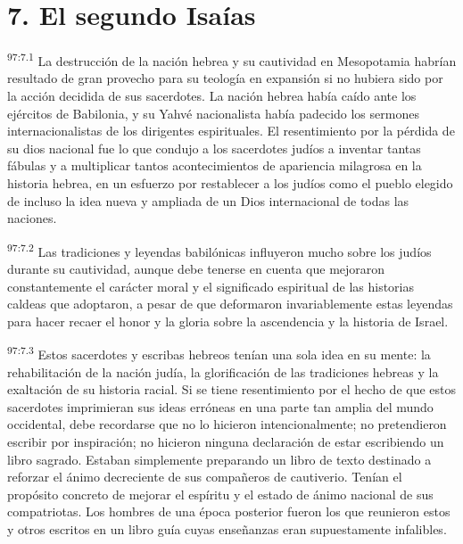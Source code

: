 \section*{7. El segundo Isaías}
\par
\textsuperscript{97:7.1} La destrucción de la nación hebrea y su cautividad en Mesopotamia habrían resultado de gran provecho para su teología en expansión si no hubiera sido por la acción decidida de sus sacerdotes. La nación hebrea había caído ante los ejércitos de Babilonia, y su Yahvé nacionalista había padecido los sermones internacionalistas de los dirigentes espirituales. El resentimiento por la pérdida de su dios nacional fue lo que condujo a los sacerdotes judíos a inventar tantas fábulas y a multiplicar tantos acontecimientos de apariencia milagrosa en la historia hebrea, en un esfuerzo por restablecer a los judíos como el pueblo elegido de incluso la idea nueva y ampliada de un Dios internacional de todas las naciones.

\par
\textsuperscript{97:7.2} Las tradiciones y leyendas babilónicas influyeron mucho sobre los judíos durante su cautividad, aunque debe tenerse en cuenta que mejoraron constantemente el carácter moral y el significado espiritual de las historias caldeas que adoptaron, a pesar de que deformaron invariablemente estas leyendas para hacer recaer el honor y la gloria sobre la ascendencia y la historia de Israel.

\par
\textsuperscript{97:7.3} Estos sacerdotes y escribas hebreos tenían una sola idea en su mente: la rehabilitación de la nación judía, la glorificación de las tradiciones hebreas y la exaltación de su historia racial. Si se tiene resentimiento por el hecho de que estos sacerdotes imprimieran sus ideas erróneas en una parte tan amplia del mundo occidental, debe recordarse que no lo hicieron intencionalmente; no pretendieron escribir por inspiración; no hicieron ninguna declaración de estar escribiendo un libro sagrado. Estaban simplemente preparando un libro de texto destinado a reforzar el ánimo decreciente de sus compañeros de cautiverio. Tenían el propósito concreto de mejorar el espíritu y el estado de ánimo nacional de sus compatriotas. Los hombres de una época posterior fueron los que reunieron estos y otros escritos en un libro guía cuyas enseñanzas eran supuestamente infalibles.

